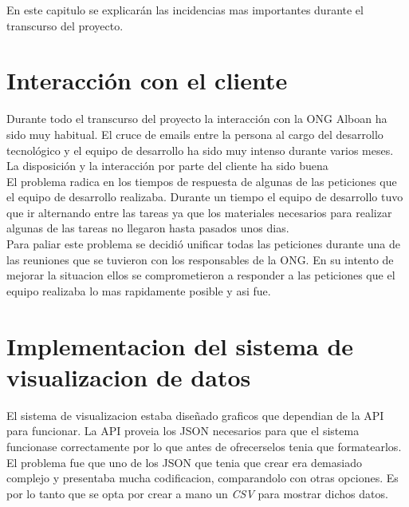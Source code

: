 En este capitulo se explicarán las incidencias mas importantes durante el transcurso del proyecto.

\section{Interacción con el cliente}
Durante todo el transcurso del proyecto la interacción con la ONG Alboan ha sido muy habitual. El cruce de emails entre la persona al cargo del desarrollo tecnológico y el equipo de desarrollo ha sido muy intenso durante varios meses. La disposición y la interacción por parte del cliente ha sido buena\\

El problema radica en los tiempos de respuesta de algunas de las peticiones que el equipo de desarrollo realizaba. Durante un tiempo el equipo de desarrollo tuvo que ir alternando entre las tareas ya que los materiales necesarios para realizar algunas de las tareas no llegaron hasta pasados unos dias.\\

Para paliar este problema se decidió unificar todas las peticiones durante una de las reuniones que se tuvieron con los responsables de la ONG. En su intento de mejorar la situacion ellos se comprometieron a responder a las peticiones que el equipo realizaba lo mas rapidamente posible y asi fue.

\section{Implementacion del sistema de visualizacion de datos}

El sistema de visualizacion estaba diseñado graficos que dependian de la API para funcionar. La API proveia los JSON necesarios para que el sistema funcionase correctamente por lo que antes de ofrecerselos tenia que formatearlos.\\

El problema fue que uno de los JSON que tenia que crear era demasiado complejo y presentaba mucha codificacion, comparandolo con otras opciones. Es por lo tanto que se opta por crear a mano un \textit{CSV} para mostrar dichos datos.